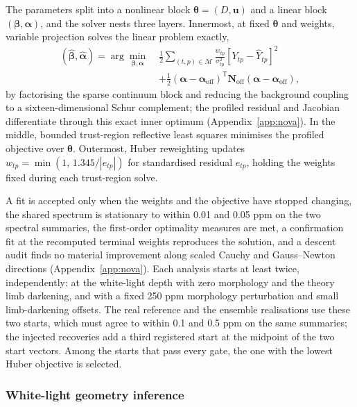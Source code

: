 The parameters split into a nonlinear block $\bm{\theta}=(D,\bm{u})$ and
a linear block $(\bm{\beta},\bm{\alpha})$, and the solver nests three
layers. Innermost, at fixed $\bm{\theta}$ and weights, variable
projection \citep{GolubPereyra1973} solves the linear problem exactly,
\begin{equation}
\begin{split}
 (\widehat{\bm{\beta}},\widehat{\bm{\alpha}})=
 \arg\min_{\bm{\beta},\bm{\alpha}}\;
 &\frac{1}{2}\sum_{(t,p)\in\mathcal{M}}\frac{w_{tp}}{\sigma_{tp}^2}
 \left[Y_{tp}-\widehat Y_{tp}\right]^2 \\
 &+\frac{1}{2}(\bm{\alpha}-\bm{\alpha}_{\mathrm{off}})^{\mathsf T}
   \bm{N}_{\mathrm{off}}(\bm{\alpha}-\bm{\alpha}_{\mathrm{off}}),
\end{split}
 \label{eq:varpro}
\end{equation}
by factorising the sparse continuum block and reducing the background
coupling to a sixteen-dimensional Schur complement; the profiled residual
and Jacobian differentiate through this exact inner optimum
(Appendix~\ref{app:nova}). In the middle, bounded trust-region reflective
least squares \citep{BranchColemanLi1999} minimises the profiled
objective over $\bm{\theta}$. Outermost, Huber reweighting
\citep{Huber1964} updates $w_{tp}=\min(1,\,1.345/|e_{tp}|)$ for
standardised residual $e_{tp}$, holding the weights fixed during each
trust-region solve.

A fit is accepted only when the weights and the objective have stopped
changing, the shared spectrum is stationary to within 0.01 and 0.05 ppm
on the two spectral summaries, the first-order optimality measures are
met, a confirmation fit at the recomputed terminal weights reproduces
the solution, and a descent audit finds no material improvement along
scaled Cauchy and Gauss--Newton directions (Appendix~\ref{app:nova}).
Each analysis starts at least twice, independently: at the white-light
depth with zero morphology and the theory limb darkening, and with a
fixed 250 ppm morphology perturbation and small limb-darkening offsets.
The real reference and the ensemble realisations use these two starts,
which must agree to within 0.1 and 0.5 ppm on the same summaries; the
injected recoveries add a third registered start at the midpoint of the
two start vectors. Among the starts that pass every gate, the one with
the lowest Huber objective is selected.

\subsubsection{White-light geometry inference}
\label{sec:own-white}

